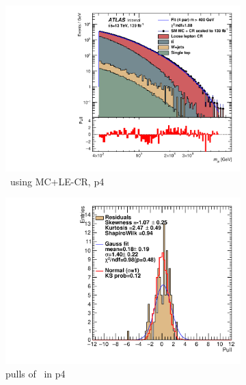 \begin{figure}[H]
    \centering
    \begin{subfigure}[h]{0.38\linewidth}
    \includegraphics[scale=0.3]{figs/ch6/fit/variable_nosmooth/p4/10PB/output_SMMCplusCR_Mje_p4.pdf}%
    \caption{\mje \ using MC+LE-CR, p4}
    \end{subfigure}
    \hfill
    \begin{subfigure}[h]{0.4\linewidth}
    \includegraphics[scale=0.32]{figs/ch6/fit/variable_nosmooth/p4/10PB/pull_SMMCplusCR_Mje_p4.pdf}%
    \caption{pulls of \mje \ in p4}
    \end{subfigure}
    \hfill
    \begin{subfigure}[h]{0.38\linewidth}

\end{subfigure}
\end{figure}
